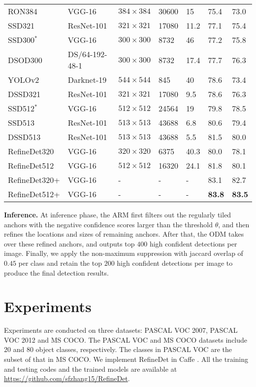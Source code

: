 \documentclass[10pt,twocolumn,letterpaper]{article}
\begin{document}
\begin{table*}[t]
\begin{tabular}{p{3.0cm}<{\centering}|p{3.0cm}<{\centering}|p{2.5cm}<{\centering}|p{1.5cm}<{\centering}|p{1.5cm}<{\centering}|p{2.2cm}<{\centering}|p{2.2cm}<{\centering}}
RON384\cite{DBLP:conf/cvpr/KongSYLLC17}     &VGG-16 &$384\times384$ &30600 &15 &75.4 &73.0\\
SSD321\cite{DBLP:journals/corr/FuLRTB17}    &ResNet-101 &$321\times321$ &17080 &11.2 &77.1 &75.4\\
SSD300$^*$\cite{DBLP:conf/eccv/LiuAESRFB16} &VGG-16 &$300\times300$ &8732 &46 &77.2 &75.8\\
DSOD300\cite{DBLP:conf/iccv/abs-1708-01241} &DS/64-192-48-1 &$300\times300$ &8732 &17.4 &77.7 &76.3\\
YOLOv2\cite{DBLP:journals/corr/RedmonF16}   &Darknet-19 &$544\times544$ &845 &40 &78.6 &73.4\\
DSSD321\cite{DBLP:journals/corr/FuLRTB17}   &ResNet-101 &$321\times321$ &17080 &9.5 &78.6 &76.3\\
SSD512$^*$\cite{DBLP:conf/eccv/LiuAESRFB16} &VGG-16 &$512\times512$ &24564 &19 &79.8 &78.5\\
SSD513\cite{DBLP:journals/corr/FuLRTB17}    &ResNet-101 &$513\times513$ &43688 &6.8 &80.6 &79.4\\
DSSD513\cite{DBLP:journals/corr/FuLRTB17}   &ResNet-101 &$513\times513$ &43688 &5.5 &81.5 &80.0\\
\hline
RefineDet320    &VGG-16     &$320\times320$ &6375  &40.3 &80.0 &78.1\\
RefineDet512    &VGG-16     &$512\times512$ &16320 &24.1 &81.8 &80.1\\
RefineDet320+   &VGG-16     &-  &- &- &83.1 &82.7\\
RefineDet512+   &VGG-16     &-  &- &- &{\bf 83.8} &{\bf 83.5}\\
\bottomrule[1.5pt]
\end{tabular}
\label{tab:pascal-voc}
\end{table*}


{\noindent \textbf{Inference.}}
At inference phase, the ARM first filters out the regularly tiled anchors with the negative confidence scores larger than the threshold $\theta$, and then refines the locations and sizes of remaining anchors. After that, the ODM takes over these refined anchors, and outputs top $400$ high confident detections per image. Finally, we apply the non-maximum suppression with jaccard overlap of $0.45$ per class and retain the top $200$ high confident detections per image to produce the final detection results.

\section{Experiments}
Experiments are conducted on three datasets: PASCAL VOC 2007, PASCAL VOC 2012 and MS COCO. The PASCAL VOC and MS COCO datasets include $20$ and $80$ object classes, respectively. The classes in PASCAL VOC are the subset of that in MS COCO. We implement RefineDet in Caffe \cite{DBLP:conf/mm/JiaSDKLGGD14}. All the training and testing codes and the trained models are available at \url{https://github.com/sfzhang15/RefineDet}.
\end{document}
